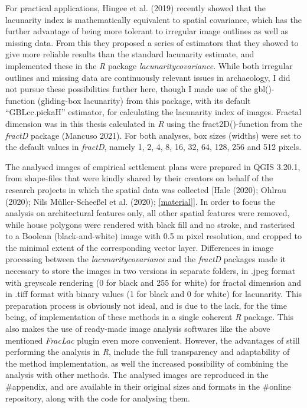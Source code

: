 \documentclass[
  12pt,
  a4paper, twoside]{book}
\begin{document}
For practical applications, Hingee et al. (2019) recently showed that the lacunarity index is mathematically equivalent to spatial covariance, which has the further advantage of being more tolerant to irregular image outlines as well as missing data. From this they proposed a series of estimators that they showed to give more reliable results than the standard lacunarity estimate, and implemented these in the \emph{R} package \emph{lacunaritycovariance}. While both irregular outlines and missing data are continuously relevant issues in archaeology, I did not pursue these possibilities further here, though I made use of the gbl()-function (gliding-box lacunarity) from this package, with its default ``GBLcc.pickaH'' estimator, for calculating the lacunarity index of images. Fractal dimension was in this thesis calculated in \emph{R} using the fract2D()-function from the \emph{fractD} package (Mancuso 2021). For both analyses, box sizes (widths) were set to the default values in \emph{fractD}, namely 1, 2, 4, 8, 16, 32, 64, 128, 256 and 512 pixels.

The analysed images of empirical settlement plans were prepared in QGIS 3.20.1, from shape-files that were kindly shared by their creators on behalf of the research projects in which the spatial data was collected {[}Hale (2020); Ohlrau (2020); Nils Müller-Scheeßel et al. (2020); \ref{material}{]}. In order to focus the analysis on architectural features only, all other spatial features were removed, while house polygons were rendered with black fill and no stroke, and rasterised to a Boolean (black-and-white) image with 0.5 m pixel resolution, and cropped to the minimal extent of the corresponding vector layer. Differences in image processing between the \emph{lacunaritycovariance} and the \emph{fractD} packages made it necessary to store the images in two versions in separate folders, in .jpeg format with greyscale rendering (0 for black and 255 for white) for fractal dimension and in .tiff format with binary values (1 for black and 0 for white) for lacunarity. This preparation process is obviously not ideal, and is due to the lack, for the time being, of implementation of these methods in a single coherent \emph{R} package. This also makes the use of ready-made image analysis softwares like the above mentioned \emph{FracLac} plugin even more convenient. However, the advantages of still performing the analysis in \emph{R}, include the full transparency and adaptability of the method implementation, as well the increased possibility of combining the analysis with other methods. The analysed images are reproduced in the \#appendix, and are available in their original sizes and formats in the \#online repository, along with the code for analysing them.
\end{document}
